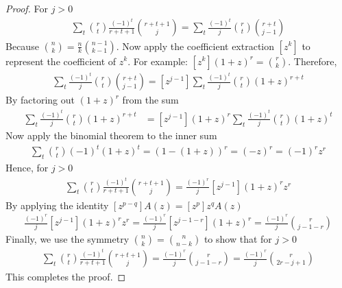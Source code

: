 \begin{lemma}
\begin{proof}
        For $j > 0$
        \begin{align*}
            \sum_t \binom{r}{t} \frac{(-1)^t}{r+t+1} \binom{r+t+1}{j} =  \sum_t \frac{(-1)^t}{j} \binom{r}{t} \binom{r+t}{j-1}
        \end{align*}
        Because $\binom{n}{k} = \frac{n}{k} \binom{n-1}{k-1}$.
        Now apply the coefficient extraction $[z^k]$ to represent the coefficient of $z^k$.
        For example: $[z^k] (1+z)^r = \binom{r}{k}$.
        Therefore,
        \begin{align*}
            \sum_t \frac{(-1)^t}{j}  \binom{r}{t} \binom{r+t}{j-1}
            = [z^{j-1}] \sum_t \frac{(-1)^t}{j} \binom{r}{t} (1+z)^{r+t}
        \end{align*}
        By factoring out $(1+z)^r$ from the sum
        \begin{align*}
            [z^{j-1}] \sum_t \frac{(-1)^t}{j} \binom{r}{t} (1+z)^{r+t}
            &= [z^{j-1}] (1+z)^r \sum_t \frac{(-1)^t}{j} \binom{r}{t} (1+z)^t
        \end{align*}
        Now apply the binomial theorem to the inner sum
        \begin{align*}
            \sum_t \binom{r}{t} (-1)^t (1+z)^t = \left(1 - (1+z)\right)^r = (-z)^r = (-1)^r z^r
        \end{align*}
        Hence, for $j>0$
        \begin{align*}
            \sum_t \binom{r}{t} \frac{(-1)^t}{r+t+1} \binom{r+t+1}{j} = \frac{(-1)^r}{j} [z^{j-1}] (1+z)^r z^r
        \end{align*}
        By applying the identity $[z^{p-q}]A(z)=[z^p]z^qA(z)$
        \begin{align*}
            \frac{(-1)^r}{j}  [z^{j-1}] (1+z)^r z^r = \frac{(-1)^r}{j}  [z^{j-1-r}] (1+z)^r = \frac{(-1)^r}{j} \binom{r}{j - 1 - r}
        \end{align*}
        Finally, we use the symmetry $\binom{n}{k} = \binom{n}{n-k}$ to show that for $j > 0$
        \begin{align*}
            \sum_t \binom{r}{t} \frac{(-1)^t}{r+t+1} \binom{r+t+1}{j} = \frac{(-1)^r}{j} \binom{r}{j - 1 - r} = \frac{(-1)^r}{j} \binom{r}{2r - j + 1}
        \end{align*}
        This completes the proof.
    \end{proof}
\end{lemma}

